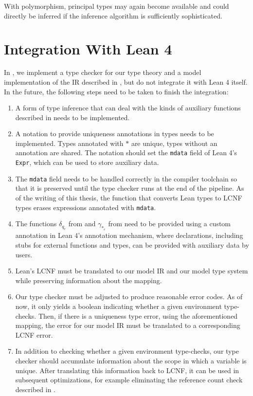With polymorphism, principal types may again become available and could directly be inferred if the inference algorithm is sufficiently sophisticated.

\section{Integration With Lean 4}
In , we implement a type checker for our type theory and a model implementation of the IR described in , but do not integrate it with Lean 4 itself. In the future, the following steps need to be taken to finish the integration:
\begin{enumerate}
	\item A form of type inference that can deal with the kinds of auxiliary functions described in  needs to be implemented.
	\item A notation to provide uniqueness annotations in types needs to be implemented. Types annotated with $*$ are unique, types without an annotation are shared. The notation should set the \lstinline|mdata| field of Lean 4's \lstinline|Expr|, which can be used to store auxiliary data.
	\item The \lstinline|mdata| field needs to be handled correctly in the compiler toolchain so that it is preserved until the type checker runs at the end of the pipeline. As of the writing of this thesis, the function that converts Lean types to LCNF types erases expressions annotated with \lstinline|mdata|.
	\item The functions $\delta_{q_e}$ from  and $\gamma_{*_e}$ from  need to be provided using a custom annotation in Lean 4's annotation mechanism, where declarations, including stubs for external functions and types, can be provided with auxiliary data by users.
	\item Lean's LCNF must be translated to our model IR and our model type system while preserving information about the mapping.
	\item Our type checker must be adjusted to produce reasonable error codes. As of now, it only yields a boolean indicating whether a given environment type-checks. Then, if there is a uniqueness type error, using the aforementioned mapping, the error for our model IR must be translated to a corresponding LCNF error.
	\item In addition to checking whether a given environment type-checks, our type checker should accumulate information about the scope in which a variable is unique. After translating this information back to LCNF, it can be used in subsequent optimizations, for example eliminating the reference count check described in .
\end{enumerate}

